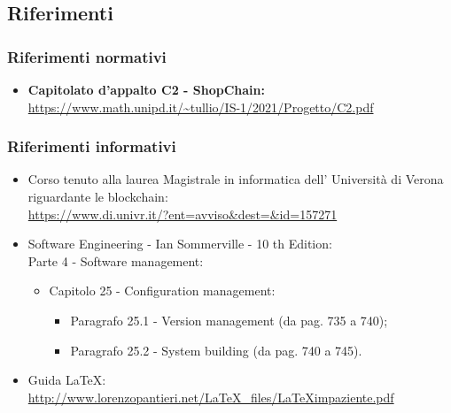 \subsection{Riferimenti}

\subsubsection{Riferimenti normativi}
\begin{itemize}
    \item \textbf{Capitolato d'appalto C2 - ShopChain:} \\
    \url{https://www.math.unipd.it/~tullio/IS-1/2021/Progetto/C2.pdf}
\end{itemize}

\subsubsection{Riferimenti informativi}
\begin {itemize}
    \item Corso tenuto alla laurea Magistrale in informatica dell' Università di Verona riguardante le blockchain\glo: \\
    \url{https://www.di.univr.it/?ent=avviso&dest=&id=157271}
    
    \item Software Engineering - Ian Sommerville - 10 th Edition:\\
    Parte 4 - Software management:
    \begin{itemize}
        \item Capitolo 25 - Configuration management:
    
    \begin{itemize}
        \item Paragrafo 25.1 - Version management (da pag. 735 a 740);
        \item Paragrafo 25.2 - System building (da pag. 740 a 745).
    \end{itemize}
\end{itemize}
    \item Guida \LaTeX:\\
    \url{http://www.lorenzopantieri.net/LaTeX_files/LaTeXimpaziente.pdf}
\end{itemize}